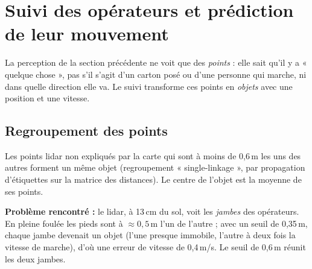 \documentclass[11pt,a4paper]{article}
\begin{document}
\section{Suivi des opérateurs et prédiction de leur mouvement}\label{sec:suivi}

La perception de la section précédente ne voit que des \emph{points} : elle sait qu'il y a
« quelque chose », pas s'il s'agit d'un carton posé ou d'une personne qui marche, ni dans quelle
direction elle va. Le suivi transforme ces points en \emph{objets} avec une position et une vitesse.

\subsection{Regroupement des points}
Les points lidar non expliqués par la carte qui sont à moins de 0,6\,m les uns des autres forment
un même objet (regroupement « single-linkage », par propagation d'étiquettes sur la matrice des
distances). Le centre de l'objet est la moyenne de ses points.

\textbf{Problème rencontré :} le lidar, à 13\,cm du sol, voit les \emph{jambes} des opérateurs. En
pleine foulée les pieds sont à $\approx 0{,}5$\,m l'un de l'autre ; avec un seuil de 0,35\,m, chaque
jambe devenait un objet (l'une presque immobile, l'autre à deux fois la vitesse de marche), d'où
une erreur de vitesse de 0,4\,m/s. Le seuil de 0,6\,m réunit les deux jambes.
\end{document}
